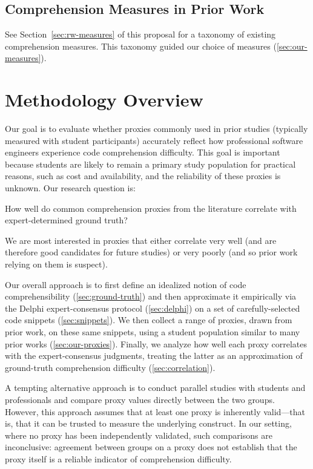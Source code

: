 \subsection{Comprehension Measures in Prior Work}
See Section~\ref{sec:rw-measures} of this proposal for a taxonomy of existing comprehension measures.
This taxonomy guided our choice of measures (\cref{sec:our-measures}).

 
\section{Methodology Overview}
\label{sec:overview}

Our goal is to evaluate whether proxies commonly used in prior studies
(typically measured with student participants) accurately reflect how
professional software engineers experience code comprehension
difficulty. This goal is important because students are likely to
remain a primary study population for practical reasons, such as cost
and availability, and the reliability of these proxies is unknown.
Our research question is:
\begin{researchquestions}
\item How well do common comprehension proxies from the literature correlate with expert-determined ground truth?
\end{researchquestions}
We are most interested in proxies that either correlate very well (and
are therefore good candidates for future studies) or very poorly (and so prior work relying on them is suspect).

Our overall approach is to first define an idealized notion of code
comprehensibility (\cref{sec:ground-truth}) and then approximate it
empirically via the Delphi expert-consensus protocol (\cref{sec:delphi})
on a set of carefully-selected code snippets (\cref{sec:snippets}).
We then collect a range of proxies, drawn from
prior work, on these same snippets, using a student population similar to many
prior works (\cref{sec:our-proxies}). Finally, we analyze how well each
proxy correlates with the expert-consensus judgments, treating the
latter as an approximation of ground-truth comprehension difficulty
(\cref{sec:correlation}).

A tempting alternative approach is to conduct parallel studies with students and professionals and compare
proxy values directly between the two groups. However, this approach assumes
that at least one proxy is inherently valid---that is, that it can be
trusted to measure the underlying construct. In our setting, where no
proxy has been independently validated, such comparisons are
inconclusive: agreement between groups on a proxy does not establish
that the proxy itself is a reliable indicator of comprehension
difficulty.

